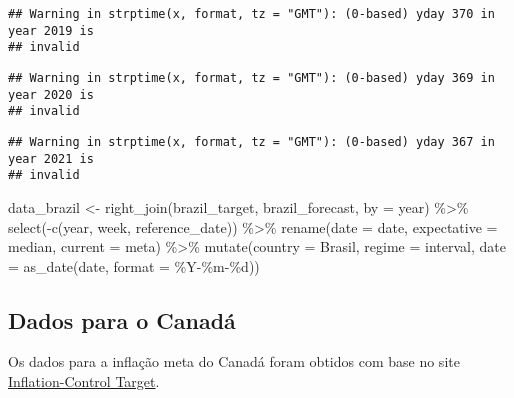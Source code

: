 \documentclass[
]{article}
\newenvironment{Shaded}{\begin{snugshade}}{\end{snugshade}}
\newcommand{\AttributeTok}[1]{\textcolor[rgb]{0.77,0.63,0.00}{#1}}
\newcommand{\FunctionTok}[1]{\textcolor[rgb]{0.00,0.00,0.00}{#1}}
\newcommand{\NormalTok}[1]{#1}
\newcommand{\OtherTok}[1]{\textcolor[rgb]{0.56,0.35,0.01}{#1}}
\newcommand{\SpecialCharTok}[1]{\textcolor[rgb]{0.00,0.00,0.00}{#1}}
\newcommand{\StringTok}[1]{\textcolor[rgb]{0.31,0.60,0.02}{#1}}
\begin{document}
\begin{verbatim}
## Warning in strptime(x, format, tz = "GMT"): (0-based) yday 370 in year 2019 is
## invalid
\end{verbatim}

\begin{verbatim}
## Warning in strptime(x, format, tz = "GMT"): (0-based) yday 369 in year 2020 is
## invalid
\end{verbatim}

\begin{verbatim}
## Warning in strptime(x, format, tz = "GMT"): (0-based) yday 367 in year 2021 is
## invalid
\end{verbatim}

\begin{Shaded}
\begin{Highlighting}[]
\NormalTok{data\_brazil }\OtherTok{\textless{}{-}} \FunctionTok{right\_join}\NormalTok{(brazil\_target, brazil\_forecast, }\AttributeTok{by =} \StringTok{\textquotesingle{}year\textquotesingle{}}\NormalTok{) }\SpecialCharTok{\%\textgreater{}\%} 
  \FunctionTok{select}\NormalTok{(}\SpecialCharTok{{-}}\FunctionTok{c}\NormalTok{(year, week, reference\_date)) }\SpecialCharTok{\%\textgreater{}\%} 
  \FunctionTok{rename}\NormalTok{(}\AttributeTok{date =}\NormalTok{ date,}
         \AttributeTok{expectative =}\NormalTok{ median,}
         \AttributeTok{current =}\NormalTok{ meta) }\SpecialCharTok{\%\textgreater{}\%} 
  \FunctionTok{mutate}\NormalTok{(}\AttributeTok{country =} \StringTok{\textquotesingle{}Brasil\textquotesingle{}}\NormalTok{, }
         \AttributeTok{regime =} \StringTok{\textquotesingle{}interval\textquotesingle{}}\NormalTok{,}
         \AttributeTok{date =} \FunctionTok{as\_date}\NormalTok{(date, }\AttributeTok{format =} \StringTok{\textquotesingle{}\%Y{-}\%m{-}\%d\textquotesingle{}}\NormalTok{))}
\end{Highlighting}
\end{Shaded}

\hypertarget{dados-para-o-canaduxe1}{%
\subsection{Dados para o Canadá}\label{dados-para-o-canaduxe1}}

Os dados para a inflação meta do Canadá foram obtidos com base no site
\href{https://www.bankofcanada.ca/rates/indicators/key-variables/inflation-control-target/}{Inflation-Control
Target}.
\end{document}
